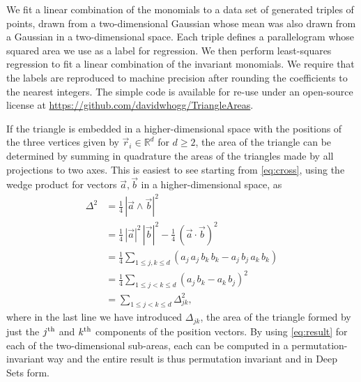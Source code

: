 \documentclass[12pt]{article}
\newcommand{\Hogg}[1]{{\color{violet} (Hogg says: #1)}}
\newcommand{\pseudosection}[1]
{}
\begin{document}
We fit a linear combination of the monomials to a data set of generated triples of points, drawn from a two-dimensional Gaussian whose mean was also drawn from a Gaussian in a two-dimensional space.
Each triple defines a parallelogram whose squared area we use as a label for regression.
We then perform least-squares regression to fit a linear combination of the invariant monomials.
We require that the labels are reproduced to machine precision after rounding the coefficients to the nearest integers.
The simple code is available for re-use under an open-source license at \url{https://github.com/davidwhogg/TriangleAreas}.

\pseudosection{Generalizations: higher dimensions}

If the triangle is embedded in a higher-dimensional space with the positions of the three vertices given by $\vec{r}_i \in \mathbb{R}^{d}$ for $d \geq 2$, the area of the triangle can be determined by summing in quadrature the areas of the triangles made by all projections to two axes. This is easiest to see starting from \eqref{eq:cross}, using the wedge product for vectors $\vec{a}, \vec{b}$ in a higher-dimensional space, as
\begin{equation}
\begin{aligned}
    \Delta^2
    &= \tfrac{1}{4}\, | \vec{a} \wedge \vec{b} |^2 \\
    &= \tfrac{1}{4}\, | \vec{a} |^2 \, | \vec{b} |^2 - \tfrac{1}{4}\, ( \vec{a} \cdot \vec{b} )^2 \\
    &= \tfrac{1}{4} \sum_{1 \leq j, k \leq d} ( a_j \, a_j \, b_k \, b_k - a_j \, b_j \, a_k \, b_k ) \\
    &= \tfrac{1}{4} \sum_{1 \leq j < k \leq d} ( a_j \, b_k - a_k \, b_j)^2 \\
    &= \sum_{1 \leq j < k \leq d} \Delta_{jk}^2,
\end{aligned}
\end{equation}
where in the last line we have introduced $\Delta_{jk}$, the area of the triangle formed by just the $j^{\rm th}$ and $k^{\rm th}$ components of the position vectors.
By using \eqref{eq:result} for each of the two-dimensional sub-areas, each can be computed in a permutation-invariant way and the entire result is thus permutation invariant and in Deep Sets form. 
\end{document}
